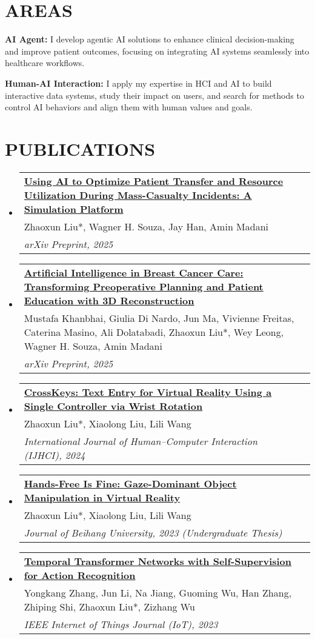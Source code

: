 \documentclass[letterpaper,11pt]{article}
\makeatletter
\newcommand{\publication}[3]{
  \vspace{-2pt}\item
    \begin{tabular*}{1.0\textwidth}[t]{l@{\extracolsep{\fill}}r}
    \textbf{\small{#1}} \\
    {#3} \\
    \textit{#2} \\
    \end{tabular*}\vspace{-7pt}
}
\newcommand{\resumeSubHeadingListStart}{\begin{itemize}[leftmargin=0.0in, label={}]}
\newcommand{\resumeSubHeadingListEnd}{\end{itemize}}
\makeatother
\begin{document}
\vspace{-10pt}
\section{AREAS}
\textbf{\small{AI Agent}:} I develop agentic AI solutions to enhance clinical decision-making and improve patient outcomes, focusing on integrating AI systems seamlessly into healthcare workflows.

\textbf{\small{Human-AI Interaction}:} I apply my expertise in HCI and AI to build interactive data systems, study their impact on users, and search for methods to control AI behaviors and align them with human values and goals.

\section{PUBLICATIONS}
    \resumeSubHeadingListStart
        \publication{\href{https://arxiv.org/abs/2509.08756}{Using AI to Optimize Patient Transfer and Resource Utilization During Mass-Casualty Incidents: A Simulation Platform}}{arXiv Preprint, 2025}{Zhaoxun Liu*, Wagner H. Souza, Jay Han, Amin Madani}
        \publication{\href{https://arxiv.org/abs/2509.12242}{Artificial Intelligence in Breast Cancer Care: Transforming Preoperative Planning and Patient Education with 3D Reconstruction}}{arXiv Preprint, 2025}{Mustafa Khanbhai, Giulia Di Nardo, Jun Ma, Vivienne Freitas, Caterina Masino, Ali Dolatabadi, Zhaoxun Liu*, Wey Leong, Wagner H. Souza, Amin Madani}
        \publication{\href{https://doi.org/10.1080/10447318.2024.2358456}{CrossKeys: Text Entry for Virtual Reality Using a Single Controller via Wrist Rotation}}{International Journal of Human–Computer Interaction (IJHCI), 2024}{Zhaoxun Liu*, Xiaolong Liu, Lili Wang}
        \publication{\href{https://lorenz.fun/files/hands-free-is-fine.pdf}{Hands-Free Is Fine: Gaze-Dominant Object Manipulation in Virtual Reality}}{Journal of Beihang University, 2023 (Undergraduate Thesis)}{Zhaoxun Liu*, Xiaolong Liu, Lili Wang}
        \publication{\href{https://doi.org/10.1109/JIOT.2023.3257992}{Temporal Transformer Networks with Self-Supervision for Action Recognition}}{IEEE Internet of Things Journal (IoT), 2023}{Yongkang Zhang, Jun Li, Na Jiang, Guoming Wu, Han Zhang, Zhiping Shi, Zhaoxun Liu*, Zizhang Wu}
    \resumeSubHeadingListEnd

\vspace{-5pt}
\end{document}
